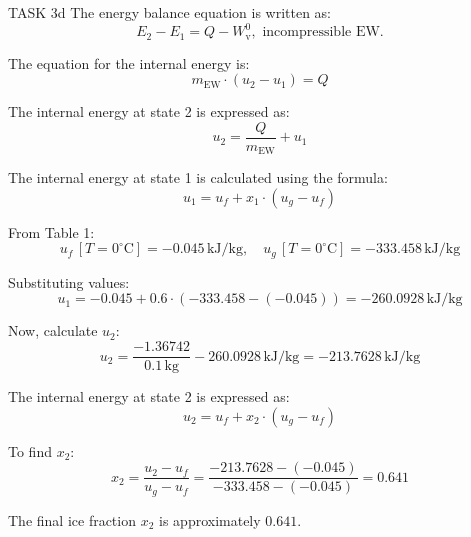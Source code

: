 TASK 3d  
The energy balance equation is written as:  
\[
E_2 - E_1 = Q - W_{\text{v}}^0, \text{ incompressible EW.}
\]  

The equation for the internal energy is:  
\[
m_{\text{EW}} \cdot (u_2 - u_1) = Q
\]  

The internal energy at state 2 is expressed as:  
\[
u_2 = \frac{Q}{m_{\text{EW}}} + u_1
\]  

The internal energy at state 1 is calculated using the formula:  
\[
u_1 = u_f + x_1 \cdot (u_g - u_f)
\]  

From Table 1:  
\[
u_f \, [T = 0^\circ\text{C}] = -0.045 \, \text{kJ/kg}, \quad u_g \, [T = 0^\circ\text{C}] = -333.458 \, \text{kJ/kg}
\]  

Substituting values:  
\[
u_1 = -0.045 + 0.6 \cdot (-333.458 - (-0.045)) = -260.0928 \, \text{kJ/kg}
\]  

Now, calculate \( u_2 \):  
\[
u_2 = \frac{-1.36742}{0.1 \, \text{kg}} - 260.0928 \, \text{kJ/kg} = -213.7628 \, \text{kJ/kg}
\]  

The internal energy at state 2 is expressed as:  
\[
u_2 = u_f + x_2 \cdot (u_g - u_f)
\]  

To find \( x_2 \):  
\[
x_2 = \frac{u_2 - u_f}{u_g - u_f} = \frac{-213.7628 - (-0.045)}{-333.458 - (-0.045)} = 0.641
\]  

The final ice fraction \( x_2 \) is approximately \( 0.641 \).